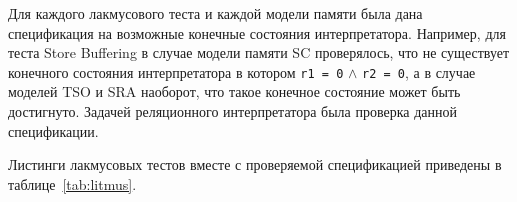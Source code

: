 Для каждого лакмусового теста и каждой модели памяти 
была дана спецификация на возможные конечные состояния интерпретатора.
Например, для теста Store Buffering в случае модели памяти SC 
проверялось, что не существует конечного состояния интерпретатора в котором 
\texttt{r1 = 0} $\wedge$ \texttt{r2 = 0}, 
а в случае моделей TSO и SRA наоборот, 
что такое конечное состояние может быть достигнуто.
Задачей реляционного интерпретатора была проверка данной спецификации.

Листинги лакмусовых тестов вместе с проверяемой спецификацией 
приведены в таблице~\ref{tab:litmus}.



    
    
    
                    
    
    
    
    
    
    
    
    
